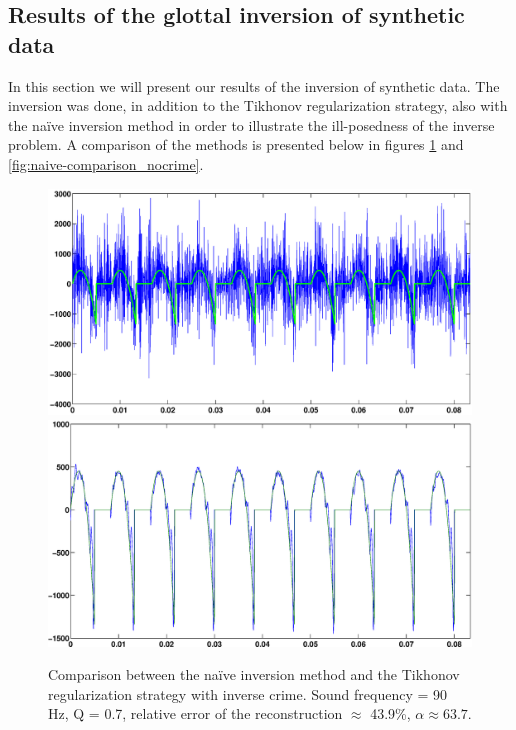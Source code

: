 \documentclass[12pt,a4]{article}
\begin{document}
\subsection{Results of the glottal inversion of synthetic data}
In this section we will present our results of the inversion of synthetic data. The inversion was done, in addition to the Tikhonov regularization strategy, also with the naïve inversion method in order to illustrate the ill-posedness of the inverse problem.
A comparison of the methods is presented below in figures \ref{fig:naive-comparison_crime} and \ref{fig:naive-comparison_nocrime}.
\begin{figure}[H]
\begin{center}
\includegraphics[scale=.3]{img/naive_test_naive.eps}
\includegraphics[scale=.3]{img/naive_test_morozov.eps}
\end{center}
\caption{Comparison between the naïve inversion method and the Tikhonov regularization strategy with inverse crime. Sound frequency = 90 Hz, Q = 0.7, relative error of the reconstruction $\approx$ 43.9\%, $\alpha \approx 63.7$.}
\label{fig:naive-comparison_crime}
\end{figure}
\end{document}
